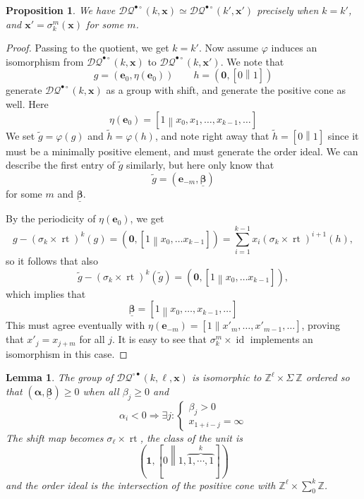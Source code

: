 \documentclass[12pt]{amsbook}%
\newcommand{\rt}{\operatorname{rt}}
\newcommand{\ee}{{\mathbf e}}
\renewcommand{\phi}{\varphi}
\newtheorem{propo}[theor]{Proposition}
\newtheorem{lemma}[theor]{Lemma}
\theoremstyle{defin}
\theoremstyle{remark}
\numberwithin{equation}{chapter}
\numberwithin{theor}{section}
\newcommand{\ZZ}{\mathbb{Z}}
\newcommand{\DQ}{\mathcal{DQ}}
\newcommand{\id}{\operatorname{id}}
\newcommand{\RSi}{{\bullet\circ}}
\newcommand{\SRi}{{\circ\bullet}}
\newcommand{\nsX}{\Sigma\ }
\newcommand{\oXe}[2]{\left[#1\left\|{#2}\right.\right]}
\newcommand{\xx}{\mathbf{x}}
\newcommand{\uu}{\mathbf{1}}
\newcommand{\oo}{{\mathbf 0}}
\newcommand{\alal}{\pmb{\alpha}}
\newcommand{\bebebe}{\underline{\pmb{\beta}}}
\begin{document}
\begin{propo}\label{RSisostable}
We have $\DQ^\RSi(k,\xx)\simeq \DQ^\RSi(k',\xx')$ precisely when $k=k'$, and $\xx'=\sigma_k^m(\xx)$ for some $m$.
\end{propo}
\begin{proof}
Passing to the quotient, we get $k=k'$. Now assume $\phi$ induces an isomorphism from $\DQ^\RSi(k,\xx)$ to $\DQ^\RSi(k,\xx')$. We note that
\[
g=(\ee_0,\eta(\ee_0))\qquad h=(\oo,\oXe{0}{1})
\]
generate $\DQ^\RSi(k,\xx)$ as a group with shift, and generate the positive cone as well. Here
\[
\eta(\ee_0)=\oXe{1}{x_0,x_1,\dots,x_{k-1},\dots}
\]
We set $\widetilde g=\phi(g)$ and $\widetilde h=\phi(h)$, and note right away that $\widetilde h=\oXe{0}{1}$ since it must be a minimally positive element, and must generate the order ideal. We can describe the first entry of $\widetilde g$ similarly, but here only know that
\[
\widetilde g=(\ee_{-m},\bebebe)
\]
for some $m$ and $\bebebe$.

By the periodicity of $\eta(\ee_0)$, we get
\[
g-(\sigma_k\times\rt)^{k}(g)=(\oo,\oXe{1}{x_0,\dots x_{k-1}})=\sum_{i=1}^{k-1} x_i(\sigma_k\times\rt)^{i+1}(h),
\]
so it follows that also 
\[
\widetilde g-(\sigma_k\times\rt)^{k}(\widetilde g)=(\oo,\oXe{1}{x_0,\dots x_{k-1}}),
\]
which implies that 
\[
\bebebe=\oXe{1}{x_0,\dots,x_{k-1},\dots}
\]
This must agree eventually with $\eta(\ee_{-m})=\oXe{1}{x'_m,\dots,x'_{m-1},\dots}$, proving that $x'_j=x_{j+m}$ for all $j$. It is easy to see that $\sigma_k^m\times\id$ implements an isomorphism in this case.
\end{proof}




\begin{lemma}\label{SRkstable}
The  group of $\DQ^\SRi(k,\ell,\xx)$  is isomorphic to $\ZZ^\ell \times\nsX\ZZ$ ordered so that $(\alal,\bebebe)\geq 0$ when all $\beta_j\geq 0$ and 
\[
\alpha_i<0\Longrightarrow \exists j:\begin{cases}\beta_j>0\\x_{1+i-j}=\infty\end{cases}
\]
The shift map becomes $\sigma_\ell\times \rt$, the class of the unit is
\[
\left(\uu,\oXe{0}{1,\overbrace{1,\cdots,1}^k}\right)
\]
and the order ideal is the intersection of the  positive cone with $\ZZ^\ell\times \sum_0^k \ZZ$.
\end{lemma}
\end{document}
